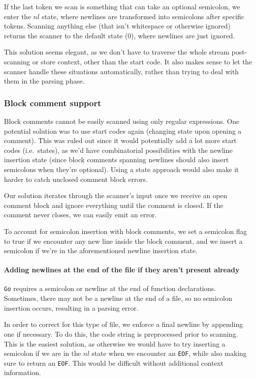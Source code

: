 \documentclass[11pt]{article}
\begin{document}
If the last token we scan is something that can take an optional
semicolon, we enter the \(nl\) state, where newlines are transformed into
semicolons after specific tokens. Scanning anything else (that isn't
whitespace or otherwise ignored) returns the scanner to the default
state (\(0\)), where newlines are just ignored.

This solution seems elegant, as we don't have to traverse
the whole stream post-scanning or store context, other than the
start code. It also makes sense to let the scanner handle these
situations automatically, rather than trying to deal with them
in the parsing phase.
\subsubsection{Block comment support}
Block comments cannot be easily scanned using only regular
expressions. One potential solution was to use start codes again
(changing state upon opening a comment). This was ruled out since
it would potentially add a lot more start codes (i.e.\ states), as
we'd have combinatorial possibilities with the newline insertion state
(since block comments spanning newlines should also insert semicolons
when they're optional). Using a state approach would also make it
harder to catch unclosed comment block errors.

Our solution iterates through the scanner's input once we receive an
open comment block and ignore everything until the comment is closed.
If the comment never closes, we can easily emit an error.

To account for semicolon insertion with block comments, we set a
semicolon flag to true if we encounter any new line inside the
block comment, and we insert a semicolon if we're in the
aforementioned newline insertion state.
\paragraph{Adding newlines at the end of the file if they aren't present already}
\texttt{Go} requires a semicolon or newline at the end of function
declarations. Sometimes, there may not be a newline at the end of
a file, so no semicolon insertion occurs, resulting in a parsing error.

In order to correct for this type of file, we enforce a final
newline by appending one if necessary. To do this, the code string
is preprocessed prior to scanning. This is the easiest solution,
as otherwise we would have to try inserting a semicolon if we are in
the \(nl\) state when we encounter an \texttt{EOF}, while also making sure
to return an \texttt{EOF}. This would be difficult without additional
context information.
\end{document}
